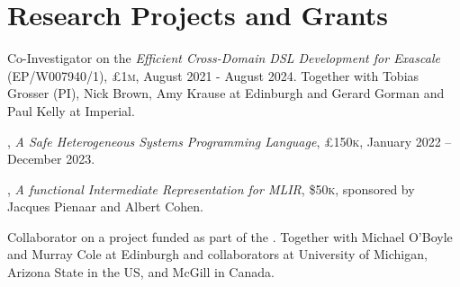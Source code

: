 \section{Research Projects and Grants}
\begin{cvitemize}
    \item Co-Investigator on the  \emph{Efficient Cross-Domain DSL Development for Exascale} (EP/W007940/1), £1\textsc{m}, August 2021 - August 2024.
    Together with Tobias Grosser (PI), Nick Brown, Amy Krause at Edinburgh and Gerard Gorman and Paul Kelly at Imperial.
\end{cvitemize}
\begin{cvitemize}
    \item {}, \textit{A Safe Heterogeneous Systems Programming Language}, £150\textsc{k}, January 2022 -- December 2023.%
\end{cvitemize}
\begin{cvitemize}
    \item {}, \textit{A functional Intermediate Representation for MLIR}, \$50\textsc{k}, sponsored by Jacques Pienaar and Albert Cohen.%
\end{cvitemize}
\begin{cvitemize}
    \item Collaborator on a project funded as part of the .
    Together with Michael O'Boyle and Murray Cole at Edinburgh and collaborators at University of Michigan, Arizona State in the US, and McGill in Canada.
\end{cvitemize}